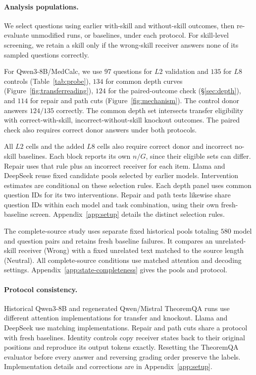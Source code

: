 \paragraph{Analysis populations.}
We select questions using earlier with-skill and without-skill outcomes,
then re-evaluate unmodified runs, or baselines, under each protocol.
For skill-level screening, we retain a skill only if the wrong-skill
receiver answers none of its sampled questions correctly.

For Qwen3-8B/MedCalc, we use $97$ questions for $L2$ validation
and $135$ for $L8$ controls
(Table~\ref{tab:probe}), $134$ for common depth curves
(Figure~\ref{fig:transferreading}), $124$ for the paired-outcome check
(\S\ref{sec:depth}), and $114$ for repair and path cuts
(Figure~\ref{fig:mechanism}). The control donor answers $124/135$
correctly. The common depth set intersects transfer eligibility with
correct-with-skill, incorrect-without-skill knockout outcomes.
The paired check also requires correct donor answers under both protocols.

All $L2$ cells and the added $L8$ cells also require correct donor and
incorrect no-skill baselines. Each block reports its own $n/G$, since
their eligible sets can differ. Repair uses that rule plus an incorrect receiver for each
item. Llama and DeepSeek reuse fixed candidate pools selected by earlier
models. Intervention estimates are conditional on these selection rules.
Each depth panel uses common question IDs for its two interventions.
Repair and path tests likewise share question IDs within each model and
task combination, using their own fresh-baseline screen.
Appendix~\ref{app:setup} details the distinct selection rules.


The complete-source study uses separate fixed historical pools totaling
$580$ model and question pairs and retains fresh baseline failures.
It compares an unrelated-skill receiver (Wrong) with a fixed unrelated
text matched to the source length (Neutral). All complete-source conditions use matched attention and decoding settings.
Appendix~\ref{app:state-completeness} gives the pools and protocol.

\paragraph{Protocol consistency.}
Historical Qwen3-8B and regenerated Qwen/Mistral TheoremQA runs use
 different attention implementations for transfer and knockout.
Llama and DeepSeek use matching implementations. Repair and path cuts share a protocol
with fresh baselines. Identity controls copy receiver states back to
their original positions and reproduce its output tokens exactly.
Resetting the TheoremQA evaluator before every answer
and reversing grading order preserve the labels. Implementation details
and corrections are in Appendix~\ref{app:setup}.

